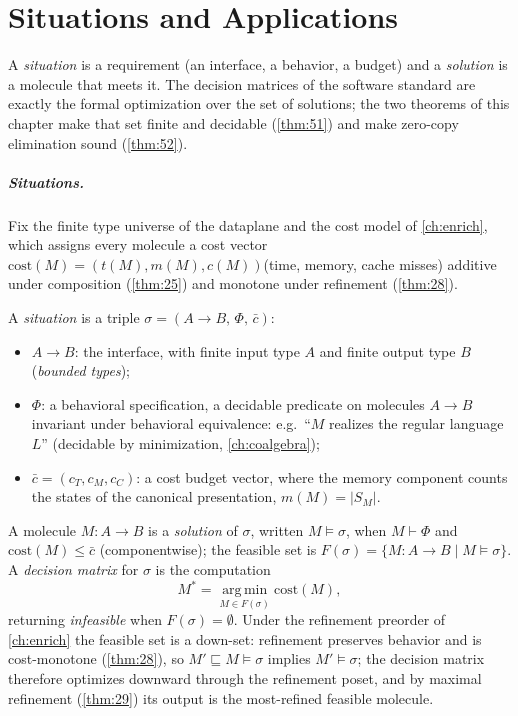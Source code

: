 \chapter{Situations and Applications}\label{ch:situations}

A \emph{situation} is a requirement (an interface, a behavior, a budget) and a \emph{solution} is a molecule that meets it. The decision matrices of the software standard are exactly the formal optimization over the set of solutions; the two theorems of this chapter make that set finite and decidable (\autoref{thm:51}) and make zero-copy elimination sound (\autoref{thm:52}).

\paragraph{Situations.}
Fix the finite type universe of the dataplane and the cost model of \autoref{ch:enrich}, which assigns every molecule a cost vector $\mathrm{cost} (M) = (t (M), m (M), c (M))$(time, memory, cache misses) additive under composition (\autoref{thm:25}) and monotone under refinement (\autoref{thm:28}).

A \emph{situation} is a triple $\sigma = (A \to B,\, \Phi,\, \bar c)$:
\begin{itemize}
\item $A \to B$: the interface, with finite input type $A$ and finite output type $B$ (\emph{bounded types});
\item $\Phi$: a behavioral specification, a decidable predicate on molecules $A \to B$ invariant under behavioral equivalence: e.g.\ ``$M$ realizes the regular language $L$'' (decidable by minimization, \autoref{ch:coalgebra});
\item $\bar c = (c_T, c_M, c_C)$: a cost budget vector, where the memory component counts the states of the canonical presentation, $m (M) = |S_M|$.
\end{itemize}

A molecule $M : A \to B$ is a \emph{solution} of $\sigma$, written $M \models \sigma$, when $M \vdash \Phi$ and $\mathrm{cost} (M) \leq \bar c$ (componentwise); the feasible set is $F (\sigma) = \{ M : A \to B \mid M \models \sigma \}$. A \emph{decision matrix} for $\sigma$ is the computation
\[
M^{*} = \operatorname*{arg\,min}_{M \in F (\sigma)} \mathrm{cost} (M),
\]
returning \emph{infeasible} when $F (\sigma) = \emptyset$. Under the refinement preorder of \autoref{ch:enrich} the feasible set is a down-set: refinement preserves behavior and is cost-monotone (\autoref{thm:28}), so $M' \sqsubseteq M \models \sigma$ implies $M' \models \sigma$; the decision matrix therefore optimizes downward through the refinement poset, and by maximal refinement (\autoref{thm:29}) its output is the most-refined feasible molecule.

